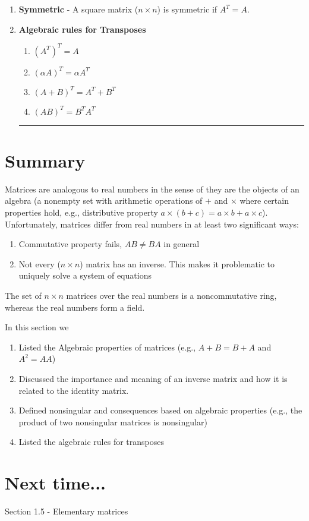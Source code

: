 \begin{enumerate}
 
 
 \item \textbf{Symmetric} - A square matrix ($n \times n$) is symmetric if $A^T = A$.
 
 
 
 \item \textbf{Algebraic rules for Transposes}
 \begin{enumerate}
 	\item $(A^{T})^T = A$
	\item $(\alpha A)^T = \alpha A^{T}$
	\item $(A+B)^T = A^{T}+ B^{T}$
	\item $ (AB)^T = B^T A^{T} $
 \end{enumerate}

\rule[0.01in]{\textwidth}{0.0025in}



\end{enumerate}









\section*{Summary}
Matrices are analogous to real numbers in the sense of they are the objects of an algebra (a nonempty set with arithmetic operations of $+$ and $\times$ where certain properties hold, e.g., distributive property $a\times (b+c) = a\times b+a\times c$).  Unfortunately, matrices differ from real numbers in at least two significant ways: 
\begin{enumerate}
	\item Commutative property fails, $AB \ne BA$ in general
	\item Not every ($n \times n$) matrix has an inverse.  This makes it problematic to uniquely solve a system of equations  
\end{enumerate}
The set of $n \times n$ matrices over the real numbers is a noncommutative ring, whereas the real numbers form a field.  


In this section we 
\begin{enumerate}
	\item Listed the Algebraic properties of matrices (e.g., $A+B = B+A$ and $A^2 = AA$)
	\item Discussed the importance and meaning of an inverse matrix and how it is related to the identity matrix.
	\item Defined nonsingular and consequences based on algebraic properties (e.g., the product of two nonsingular matrices is nonsingular)  
	\item Listed the algebraic rules for transposes
	
\end{enumerate}
 



\section*{Next time...}
Section 1.5 - Elementary matrices

